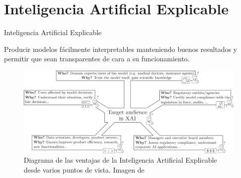 \documentclass{beamer}
\begin{document}
\section{Inteligencia Artificial Explicable}
\begin{frame}{Inteligencia Artificial Explicable}

	Producir modelos fácilmente interpretables manteniendo buenos resultados y permitir que sean transparentes de cara a su funcionamiento.

	\begin{figure}[H]
		\centering
		\includegraphics[scale = 0.65]{esquema_xai.png}
		\caption{Diagrama de las ventajas de la Inteligencia Artificial Explicable desde varios puntos de vista. Imagen de \cite{XAI}}
		\label{fig:esquema_xai}
	\end{figure}

\end{frame}
\end{document}
